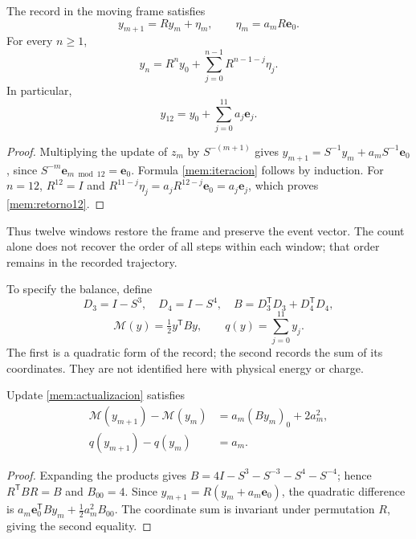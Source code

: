 \begin{proposition}
\label{mem:prop-actualizacion}
The record in the moving frame satisfies
\begin{equation}
 y_{m+1}=Ry_m+\eta_m,\qquad
 \eta_m=a_mR\mathbf e_0.
 \label{mem:actualizacion}
\end{equation}
For every \(n\geq1\),
\begin{equation}
 y_n=R^ny_0+\sum_{j=0}^{n-1}R^{n-1-j}\eta_j.
 \label{mem:iteracion}
\end{equation}
In particular,
\begin{equation}
 y_{12}=y_0+\sum_{j=0}^{11}a_j\mathbf e_j.
 \label{mem:retorno12}
\end{equation}
\end{proposition}
\begin{proof}
Multiplying the update of \(z_m\) by \(S^{-(m+1)}\) gives
\(y_{m+1}=S^{-1}y_m+a_mS^{-1}\mathbf e_0\), since
\(S^{-m}\mathbf e_{m\bmod12}=\mathbf e_0\).
Formula \eqref{mem:iteracion} follows by induction.
For \(n=12\), \(R^{12}=I\) and
\(R^{11-j}\eta_j=a_jR^{12-j}\mathbf e_0=a_j\mathbf e_j\),
which proves \eqref{mem:retorno12}.
\end{proof}

Thus twelve windows restore the frame and preserve the event vector.
The count alone does not recover the order of all steps within each
window; that order remains in the recorded trajectory.

To specify the balance, define
\[
 D_3=I-S^3,\quad D_4=I-S^4,\quad
 B=D_3^{\mathsf T}D_3+D_4^{\mathsf T}D_4,
\]
\[
 \mathcal M(y)=\tfrac12y^{\mathsf T}By,
 \qquad q(y)=\sum_{j=0}^{11}y_j.
\]
The first is a quadratic form of the record; the second records the sum
of its coordinates. They are not identified here with physical energy or charge.

\begin{proposition}
\label{mem:prop-balance}
Update \eqref{mem:actualizacion} satisfies
\begin{equation}
 \begin{aligned}
 \mathcal M(y_{m+1})-\mathcal M(y_m)
   &=a_m(By_m)_0+2a_m^2,\\
 q(y_{m+1})-q(y_m)&=a_m.
 \end{aligned}
 \label{mem:balance}
\end{equation}
\end{proposition}
\begin{proof}
Expanding the products gives
\(B=4I-S^3-S^{-3}-S^4-S^{-4}\); hence
\(R^{\mathsf T}BR=B\) and \(B_{00}=4\).
Since \(y_{m+1}=R(y_m+a_m\mathbf e_0)\), the quadratic difference
is \(a_m\mathbf e_0^{\mathsf T}By_m+\tfrac12a_m^2B_{00}\).
The coordinate sum is invariant under permutation \(R\),
giving the second equality.
\end{proof}

